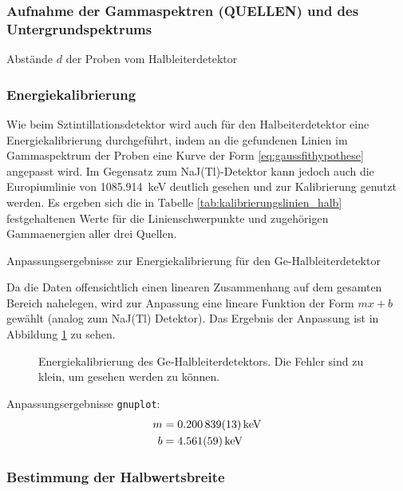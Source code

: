 \documentclass[11pt, a4paper]{article}
\numberwithin{equation}{section}
\begin{document}
\subsubsection{Aufnahme der Gammaspektren (QUELLEN) und des Untergrundspektrums}
\begin{table}[h]
	\centering
	
	\caption{Abstände $d$ der Proben vom Halbleiterdetektor}
	\label{tab:abstand_halbleiterdetektor}
\end{table}

\subsubsection{Energiekalibrierung}

Wie beim Sztintillationsdetektor wird auch für den Halbeiterdetektor eine Energiekalibrierung durchgeführt, indem an die gefundenen Linien im Gammaspektrum der Proben eine Kurve der Form \eqref{eq:gaussfithypothese} angepasst wird.
Im Gegensatz zum NaJ(Tl)-Detektor kann jedoch auch die Europiumlinie von \SI{1085.914}{\kilo\electronvolt} deutlich gesehen und zur Kalibrierung genutzt werden.
Es ergeben sich die in Tabelle \ref{tab:kalibrierungslinien_halb} festgehaltenen Werte für die Linienschwerpunkte und zugehörigen Gammaenergien aller drei Quellen.
\begin{table}[ht]
	\centering
	
	\caption{Anpassungsergebnisse zur Energiekalibrierung für den Ge-Halbleiterdetektor}
	\label{tab:kalibrierungslinien_halb}
\end{table}
Da die Daten offensichtlich einen linearen Zusammenhang auf dem gesamten Bereich nahelegen, wird zur Anpassung eine lineare Funktion der Form $mx + b$ gewählt (analog zum NaJ(Tl) Detektor).
Das Ergebnis der Anpassung ist in Abbildung \ref{fig:kalibrierung_halb} zu sehen.
\begin{figure}[ht]
	\centering
	
	\caption{Energiekalibrierung des Ge-Halbleiterdetektors. Die Fehler sind zu klein, um gesehen werden zu können.}
	\label{fig:kalibrierung_halb}
\end{figure}  
Anpassungsergebnisse \texttt{gnuplot}:
\begin{align}
	m &= \SI{0.200839 +- 0.000013}{\kilo\electronvolt} \\
	b &= \SI{4.561 +- 0.059}{\kilo\electronvolt}
\end{align}


\subsubsection{Bestimmung der Halbwertsbreite}
\end{document}
